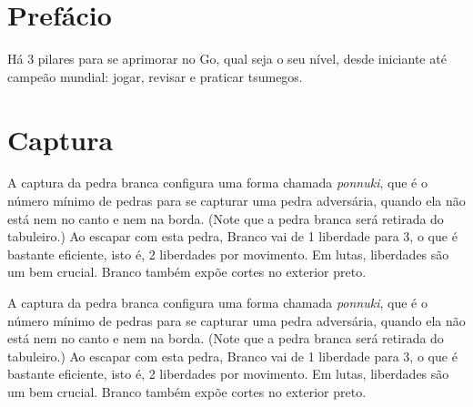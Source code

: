 \documentclass{book}
\begin{document}
  \tableofcontents
  
  \chapter{Prefácio}
  
  Há 3 pilares para se aprimorar no Go, qual seja o seu nível, desde iniciante até campeão mundial: jogar, revisar e praticar tsumegos.


  \chapter{Captura}

  \problemDiagrams
  \answerDiagrams%
    {A captura da pedra branca configura uma forma chamada \emph{ponnuki}, que é o número mínimo de pedras para se capturar uma pedra adversária, quando ela não está nem no canto e nem na borda. (Note que a pedra branca será retirada do tabuleiro.)}%
    {Ao escapar com esta pedra, Branco vai de 1 liberdade para 3, o que é bastante eficiente, isto é, 2 liberdades por movimento. Em lutas, liberdades são um bem crucial. Branco também expõe cortes no exterior preto.}%

  \problemDiagrams
  \answerDiagrams%
    {A captura da pedra branca configura uma forma chamada \emph{ponnuki}, que é o número mínimo de pedras para se capturar uma pedra adversária, quando ela não está nem no canto e nem na borda. (Note que a pedra branca será retirada do tabuleiro.)}%
    {Ao escapar com esta pedra, Branco vai de 1 liberdade para 3, o que é bastante eficiente, isto é, 2 liberdades por movimento. Em lutas, liberdades são um bem crucial. Branco também expõe cortes no exterior preto.}%
\end{document}
